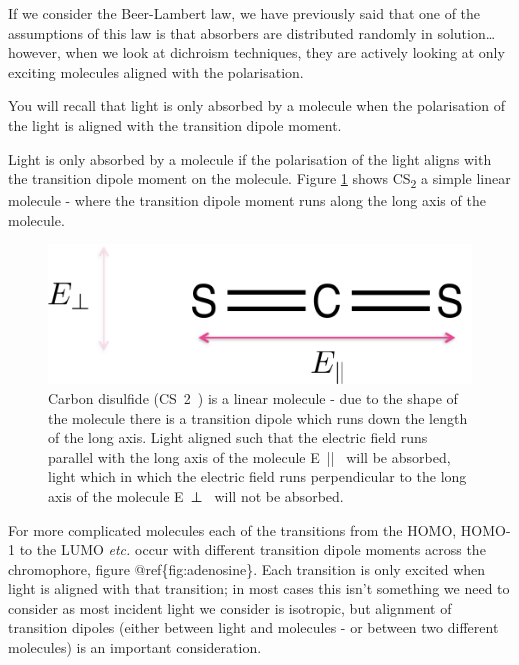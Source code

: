 \documentclass[
]{book}
\begin{document}
If we consider the Beer-Lambert law, we have previously said that one of the assumptions of this law is that absorbers are distributed randomly in solution\ldots{} however, when we look at dichroism techniques, they are actively looking at only exciting molecules aligned with the polarisation.

You will recall that light is only absorbed by a molecule when the polarisation of the light is aligned with the transition dipole moment.

Light is only absorbed by a molecule if the polarisation of the light aligns with the transition dipole moment on the molecule. Figure \ref{fig:CS2} shows CS\textsubscript{2} a simple linear molecule - where the transition dipole moment runs along the long axis of the molecule.

\begin{figure}

{\centering \includegraphics[width=0.6\linewidth]{images/CS2} 

}

\caption{Carbon disulfide (CS~2~) is a linear molecule -  due to the shape of the molecule there is a transition dipole which runs down the length of the long axis. Light aligned such that the electric field runs parallel with the long axis of the molecule E~||~ will be absorbed, light which in which the electric field runs perpendicular to the long axis of the molecule E~⊥~ will not be absorbed.}\label{fig:CS2}
\end{figure}

For more complicated molecules each of the transitions from the HOMO, HOMO-1 to the LUMO \emph{etc.} occur with different transition dipole moments across the chromophore, figure @ref\{fig:adenosine\}. Each transition is only excited when light is aligned with that transition; in most cases this isn't something we need to consider as most incident light we consider is isotropic, but alignment of transition dipoles (either between light and molecules - or between two different molecules) is an important consideration.
\end{document}

